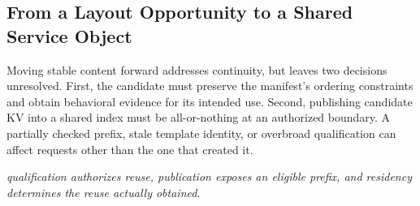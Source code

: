 \subsection{From a Layout Opportunity to a Shared Service Object}
Moving stable content forward addresses continuity, but leaves two decisions unresolved. First, the candidate must preserve the manifest's ordering constraints and obtain behavioral evidence for its intended use. Second, publishing candidate KV into a shared index must be all-or-nothing at an authorized boundary. A partially checked prefix, stale template identity, or overbroad qualification can affect requests other than the one that created it.

\emph{qualification authorizes reuse, publication exposes an eligible prefix, and residency determines the reuse actually obtained}.
